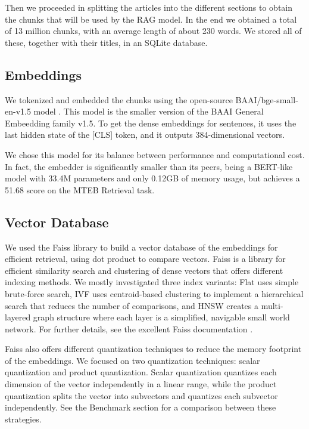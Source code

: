 \documentclass[11pt]{article}
\begin{document}
Then we proceeded in splitting the articles into the different sections to obtain the chunks 
that will be used by the RAG model. 
In the end we obtained a total of 13 million chunks, with an average length of about 230 words.
We stored all of these, together with their titles, in an SQLite database.

\subsection{Embeddings}

We tokenized and embedded the chunks using the open-source BAAI/bge-small-en-v1.5 model 
\cite{bge_hf}. This model is the smaller version of the BAAI General Embeedding family v1.5. 
To get the dense embeddings for sentences, it uses the last hidden state of the [CLS] token, and it outputs 
384-dimensional vectors.

We chose this model for its balance between performance and computational cost.
In fact, the embedder is significantly smaller than its peers, being a BERT-like model with 33.4M 
parameters and only 0.12GB of memory usage, but achieves a 51.68 score on the MTEB Retrieval task.

\subsection{Vector Database}

We used the Faiss library to build a vector database of the embeddings for efficient retrieval, using dot product to compare vectors.
Faiss is a library for efficient similarity search and clustering of dense vectors that offers different indexing methods.
We mostly investigated three index variants: Flat uses simple brute-force search, IVF uses centroid-based clustering to 
implement a hierarchical search that reduces the number of comparisons, and HNSW creates a multi-layered graph structure 
where each layer is a simplified, navigable small world network. For further details, see the excellent Faiss documentation \cite{faiss}.

Faiss also offers different quantization techniques to reduce the memory footprint of the embeddings. We focused
on two quantization techniques: scalar quantization and product quantization. 
Scalar quantization quantizes each dimension of the vector independently in a linear
range, while the product quantization splits the vector into subvectors and quantizes each
subvector independently. See the Benchmark section for a comparison between these strategies.
\end{document}
